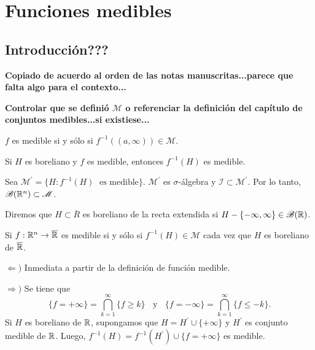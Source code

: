 \chapter{Funciones medibles
}

\section{Introducci\'on???}

\textbf{ Copiado de acuerdo al orden de las notas manuscritas...parece que falta algo para el contexto...}

\textbf{Controlar que se defini\'o  $\mathscr{M}$ o referenciar la definici\'on del cap\'itulo  de conjuntos medibles...si existiese...}

\begin{definicion}{}
$f$ es medible si y s\'olo si $f^{-1}((a,\infty)) \in \mathscr{M}$. 
\end{definicion}

\begin{teorema}{}
Si $H$ es boreliano y $f$ es medible, entonces $f^{-1}(H)$ es medible.
\end{teorema}

\begin{demo}{}
Sea $\mathscr{M}^{'}=\{ H: f^{-1}(H)\;\mbox{ es medible}\}$.
$\mathscr{M}^{'}$ es $\sigma$-\'algebra y $\mathscr{I}\subset \mathscr{M}^{'}$.
Por lo tanto, $\mathscr{B}(\mathbb{R}^n) \subset \mathscr{M}$.
\end{demo}

\begin{definicion}{}
Diremos que $H \subset \overline{R}$ es boreliano de la recta extendida si $H-\{ -\infty, \infty\} \in \mathscr{B}(\mathbb{R})$.
\end{definicion}

\begin{teorema}{}
Si $f:\mathbb{R}^n \to \overline{\mathbb{R}}$ es medible si y s\'olo si $f^{-1}(H) \in \mathscr{M}$ cada vez que $H$ es boreliano de $\overline{\mathbb{R}}$.
\end{teorema}

\begin{demo}
$\Leftarrow)$ Inmediata a partir de la definici\'on de funci\'on medible.

$\Rightarrow)$ Se tiene que 
\[
\{f=+\infty\}=\bigcap\limits_{k=1}^{\infty} \{f \geq k\}
\;\;\mbox{ y }\;\;
\{f=-\infty\}=\bigcap\limits_{k=1}^{\infty} \{f \leq -k\}.
\]
Si $H$ es boreliano de $\mathbb{R}$, supongamos que $H=H^{'}\cup \{+\infty\}$ y $H^{'}$ es conjunto medible de $\mathbb{R}$.
Luego, $f^{-1}(H)=f^{-1}(H^{'})\cup \{f=+\infty\}$ es medible.
\end{demo}


